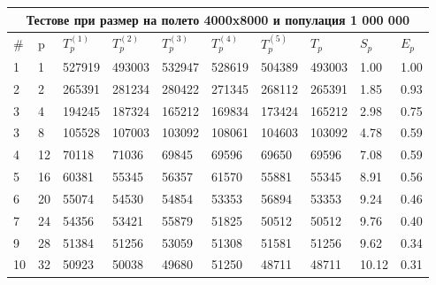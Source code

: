 \documentclass[12pt]{article}
\begin{document}
\bigbreak

\begin{tabular}{ |p{0.4cm}||p{0.4cm}|p{1.1cm}|p{1.1cm}|p{1.1cm}|p{1.1cm}|p{1.1cm}|p{1.1cm}|p{0.9cm}|p{0.9cm}| }
 \hline
 \multicolumn{10}{|c|}{Тестове при размер на полето 4000x8000 и популация 1 000 000} \\
 \hline
 \# & p & $T^{(1)}_p$ & $T^{(2)}_p$ & $T^{(3)}_p$ & $T^{(4)}_p$ & $T^{(5)}_p$ & $T_p$ & $S_p$ & $E_p$ \\
 \hline
1  & 1  & 527919 & 493003 & 532947 & 528619 & 504389 & 493003 & 1.00 & 1.00 \\
2  & 2  & 265391 & 281234 & 280422 & 271345 & 268112 & 265391 & 1.85 & 0.93 \\
3  & 4  & 194245  & 187324 & 165212 & 169834 & 173424 & 165212 & 2.98 & 0.75 \\
3  & 8  & 105528 & 107003 & 103092 & 108061 & 104603 & 103092 & 4.78 & 0.59 \\
4  & 12 & 70118 & 71036 & 69845 & 69596 & 69650 & 69596 & 7.08 & 0.59 \\
5  & 16 & 60381 & 55345 & 56357 & 61570 & 55881 & 55345 & 8.91 & 0.56 \\
6  & 20 & 55074 & 54530 & 54854 & 53353 & 56894 & 53353 & 9.24 & 0.46 \\
7  & 24 & 54356 & 53421 & 55879 & 51825 & 50512 & 50512 & 9.76 & 0.40 \\
9  & 28 & 51384 & 51256 & 53059 & 51308 & 51581 & 51256 & 9.62 & 0.34 \\
10 & 32 & 50923 & 50038 & 49680 & 51250 & 48711 & 48711 & 10.12 & 0.31 \\
 \hline
\end{tabular}
\newpage

\hspace*{-2cm}
\hskip 5pt
\end{document}
